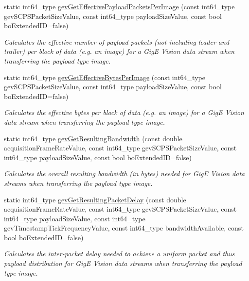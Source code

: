 \begin{DoxyCompactItemize}
\item 
static int64\+\_\+type \hyperlink{classmv_i_m_p_a_c_t_1_1acquire_1_1_gen_i_cam_1_1_transport_layer_control_a0e6a6f50a985c57aeeecb9f204944be3}{gev\+Get\+Effective\+Payload\+Packets\+Per\+Image} (const int64\+\_\+type gev\+S\+C\+P\+S\+Packet\+Size\+Value, const int64\+\_\+type payload\+Size\+Value, const bool bo\+Extended\+I\+D=false)
\begin{DoxyCompactList}\small\item\em Calculates the effective number of payload packets (not including leader and trailer) per block of data (e.\+g. an image) for a Gig\+E Vision data stream when transferring the payload type {\itshape image}. \end{DoxyCompactList}\item 
static int64\+\_\+type \hyperlink{classmv_i_m_p_a_c_t_1_1acquire_1_1_gen_i_cam_1_1_transport_layer_control_aeaecab175ca52518710bf16029b46e58}{gev\+Get\+Effective\+Bytes\+Per\+Image} (const int64\+\_\+type gev\+S\+C\+P\+S\+Packet\+Size\+Value, const int64\+\_\+type payload\+Size\+Value, const bool bo\+Extended\+I\+D=false)
\begin{DoxyCompactList}\small\item\em Calculates the effective bytes per block of data (e.\+g. an image) for a Gig\+E Vision data stream when transferring the payload type {\itshape image}. \end{DoxyCompactList}\item 
static int64\+\_\+type \hyperlink{classmv_i_m_p_a_c_t_1_1acquire_1_1_gen_i_cam_1_1_transport_layer_control_a6e2f900d04cfa21e7c40b2c032c3441b}{gev\+Get\+Resulting\+Bandwidth} (const double acquisition\+Frame\+Rate\+Value, const int64\+\_\+type gev\+S\+C\+P\+S\+Packet\+Size\+Value, const int64\+\_\+type payload\+Size\+Value, const bool bo\+Extended\+I\+D=false)
\begin{DoxyCompactList}\small\item\em Calculates the overall resulting bandwidth (in bytes) needed for Gig\+E Vision data streams when transferring the payload type {\itshape image}. \end{DoxyCompactList}\item 
static int64\+\_\+type \hyperlink{classmv_i_m_p_a_c_t_1_1acquire_1_1_gen_i_cam_1_1_transport_layer_control_accd690806029c82807ff315529079400}{gev\+Get\+Resulting\+Packet\+Delay} (const double acquisition\+Frame\+Rate\+Value, const int64\+\_\+type gev\+S\+C\+P\+S\+Packet\+Size\+Value, const int64\+\_\+type payload\+Size\+Value, const int64\+\_\+type gev\+Timestamp\+Tick\+Frequency\+Value, const int64\+\_\+type bandwidth\+Available, const bool bo\+Extended\+I\+D=false)
\begin{DoxyCompactList}\small\item\em Calculates the inter-\/packet delay needed to achieve a uniform packet and thus payload distribution for Gig\+E Vision data streams when transferring the payload type {\itshape image}. \end{DoxyCompactList}\end{DoxyCompactItemize}
